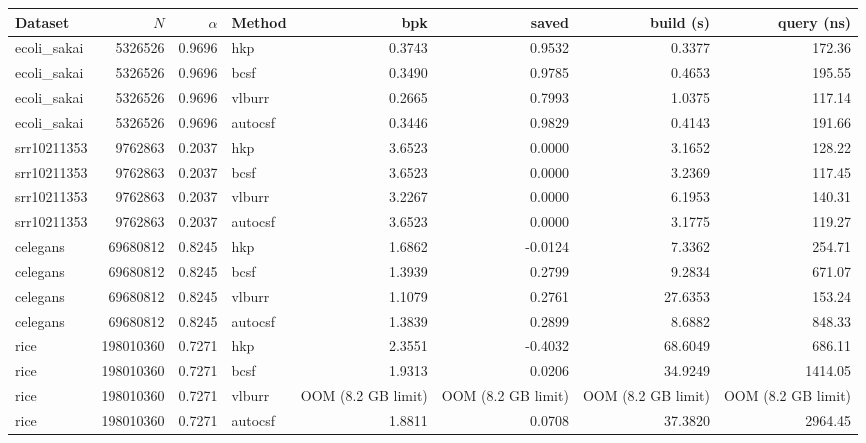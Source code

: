 \begin{tabular}{lrrlrrrr}
Dataset & $N$ & $\alpha$ & Method & bpk & saved & build (s) & query (ns) \\
\hline
ecoli\_sakai & 5326526 & 0.9696 & hkp & 0.3743 & 0.9532 & 0.3377 & 172.36 \\
ecoli\_sakai & 5326526 & 0.9696 & bcsf & 0.3490 & 0.9785 & 0.4653 & 195.55 \\
ecoli\_sakai & 5326526 & 0.9696 & vlburr & 0.2665 & 0.7993 & 1.0375 & 117.14 \\
ecoli\_sakai & 5326526 & 0.9696 & autocsf & 0.3446 & 0.9829 & 0.4143 & 191.66 \\
srr10211353 & 9762863 & 0.2037 & hkp & 3.6523 & 0.0000 & 3.1652 & 128.22 \\
srr10211353 & 9762863 & 0.2037 & bcsf & 3.6523 & 0.0000 & 3.2369 & 117.45 \\
srr10211353 & 9762863 & 0.2037 & vlburr & 3.2267 & 0.0000 & 6.1953 & 140.31 \\
srr10211353 & 9762863 & 0.2037 & autocsf & 3.6523 & 0.0000 & 3.1775 & 119.27 \\
celegans & 69680812 & 0.8245 & hkp & 1.6862 & -0.0124 & 7.3362 & 254.71 \\
celegans & 69680812 & 0.8245 & bcsf & 1.3939 & 0.2799 & 9.2834 & 671.07 \\
celegans & 69680812 & 0.8245 & vlburr & 1.1079 & 0.2761 & 27.6353 & 153.24 \\
celegans & 69680812 & 0.8245 & autocsf & 1.3839 & 0.2899 & 8.6882 & 848.33 \\
rice & 198010360 & 0.7271 & hkp & 2.3551 & -0.4032 & 68.6049 & 686.11 \\
rice & 198010360 & 0.7271 & bcsf & 1.9313 & 0.0206 & 34.9249 & 1414.05 \\
rice & 198010360 & 0.7271 & vlburr & OOM (8.2 GB limit) & OOM (8.2 GB limit) & OOM (8.2 GB limit) & OOM (8.2 GB limit) \\
rice & 198010360 & 0.7271 & autocsf & 1.8811 & 0.0708 & 37.3820 & 2964.45 \\
\end{tabular}
